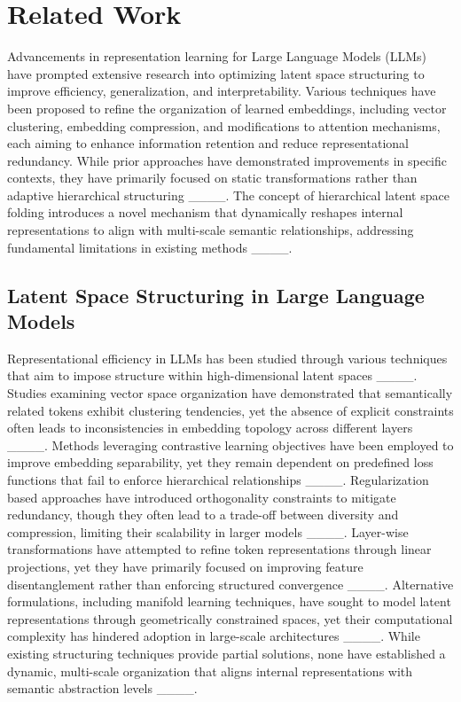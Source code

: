\section{Related Work}
Advancements in representation learning for Large Language Models (LLMs) have prompted extensive research into optimizing latent space structuring to improve efficiency, generalization, and interpretability. Various techniques have been proposed to refine the organization of learned embeddings, including vector clustering, embedding compression, and modifications to attention mechanisms, each aiming to enhance information retention and reduce representational redundancy. While prior approaches have demonstrated improvements in specific contexts, they have primarily focused on static transformations rather than adaptive hierarchical structuring ____. The concept of hierarchical latent space folding introduces a novel mechanism that dynamically reshapes internal representations to align with multi-scale semantic relationships, addressing fundamental limitations in existing methods ____. 

\subsection{Latent Space Structuring in Large Language Models}

Representational efficiency in LLMs has been studied through various techniques that aim to impose structure within high-dimensional latent spaces ____. Studies examining vector space organization have demonstrated that semantically related tokens exhibit clustering tendencies, yet the absence of explicit constraints often leads to inconsistencies in embedding topology across different layers ____. Methods leveraging contrastive learning objectives have been employed to improve embedding separability, yet they remain dependent on predefined loss functions that fail to enforce hierarchical relationships ____. Regularization based approaches have introduced orthogonality constraints to mitigate redundancy, though they often lead to a trade-off between diversity and compression, limiting their scalability in larger models ____. Layer-wise transformations have attempted to refine token representations through linear projections, yet they have primarily focused on improving feature disentanglement rather than enforcing structured convergence ____. Alternative formulations, including manifold learning techniques, have sought to model latent representations through geometrically constrained spaces, yet their computational complexity has hindered adoption in large-scale architectures ____. While existing structuring techniques provide partial solutions, none have established a dynamic, multi-scale organization that aligns internal representations with semantic abstraction levels ____.

